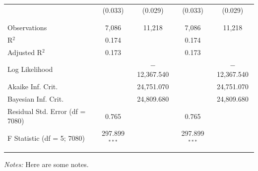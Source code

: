 \begin{table}[!htbp]
\begin{tabular}{@{\extracolsep{5pt}}lcccc}
  & (0.033) & (0.029) & (0.033) & (0.029) \\ 
  & & & & \\ 
\hline \\[-1.8ex] 
Observations & 7,086 & 11,218 & 7,086 & 11,218 \\ 
R$^{2}$ & 0.174 &  & 0.174 &  \\ 
Adjusted R$^{2}$ & 0.173 &  & 0.173 &  \\ 
Log Likelihood &  & $-$12,367.540 &  & $-$12,367.540 \\ 
Akaike Inf. Crit. &  & 24,751.070 &  & 24,751.070 \\ 
Bayesian Inf. Crit. &  & 24,809.680 &  & 24,809.680 \\ 
Residual Std. Error (df = 7080) & 0.765 &  & 0.765 &  \\ 
F Statistic (df = 5; 7080) & 297.899$^{***}$ &  & 297.899$^{***}$ &  \\ 
\hline 
\hline \\[-1.8ex] 
\end{tabular}
\emph{Notes:} Here are some notes.
\end{table}
